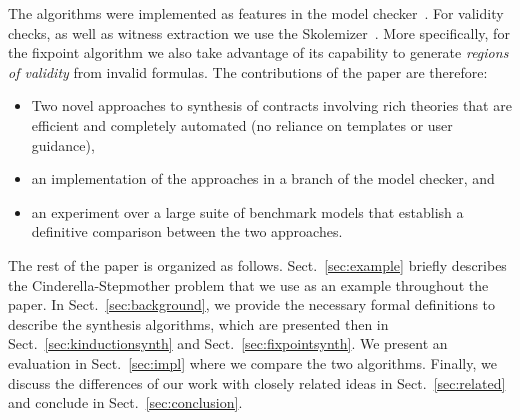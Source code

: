 The algorithms were implemented as features in the \jkind model checker~\cite{gacek2018jk}. For validity checks, as well as witness extraction we use the \aeval Skolemizer~\cite{fedyukovich2015automated}. More specifically, for the fixpoint algorithm we also take advantage of its capability to generate \textit{regions of validity} from invalid formulas.
The contributions of the paper are therefore:
\begin{itemize}
    \item Two novel approaches to synthesis of contracts involving rich theories that are efficient and completely automated (no reliance on templates or user guidance),
    \item an implementation of the approaches in a branch of the \jkind model checker, and
    \item an experiment over a large suite of benchmark models that establish a definitive comparison between the two approaches.
\end{itemize}

The rest of the paper is organized as follows. Sect.~\ref{sec:example} briefly describes the Cinderella-Stepmother problem that we use as an example throughout the paper. In Sect.~\ref{sec:background}, we provide the necessary formal definitions to describe the synthesis algorithms, which are presented then in Sect.~\ref{sec:kinductionsynth} and Sect.~\ref{sec:fixpointsynth}. We present an evaluation in Sect.~\ref{sec:impl} where we compare the two algorithms. Finally, we discuss the differences of our work with closely related ideas in Sect.~\ref{sec:related} and conclude in Sect.~\ref{sec:conclusion}.